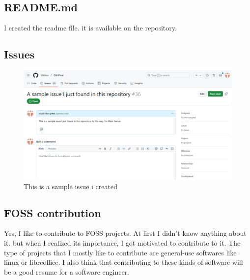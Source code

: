 \documentclass[12pt, letterpaper]{article}
\begin{document}
\begin{enumerate}
\subsection{README.md} I created the readme file. it is available on the repository.
\subsection{Issues}
\begin{figure}[!b]
    \centering
    \includegraphics[width=1\linewidth]{ggvg.png}
    \caption{This is a sample issue i created}
    \label{fig:enter-label}
\end{figure}
\FloatBarrier

\subsection{FOSS contribution}
Yes, I like to contribute to FOSS projects. At first I didn't know anything about it. but when I realized its importance, I got motivated to contribute to it. The type of projects that I mostly like to contribute are general-use softwares like linux or libreoffice. I also think that contributing to these kinds of software will be a good resume for a software engineer. 
\end{enumerate}
\end{document}
